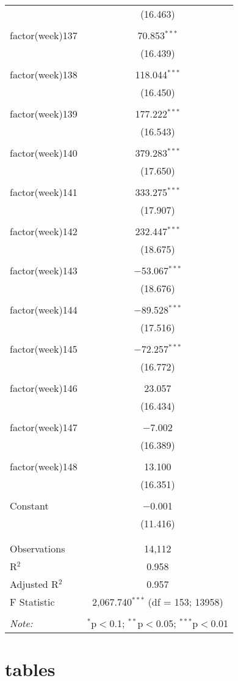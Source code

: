 \documentclass{article}
\begin{document}
\begin{table}[!htbp]
\begin{tabular}{@{\extracolsep{5pt}}lc}
  & (16.463) \\ 
  & \\ 
 factor(week)137 & 70.853$^{***}$ \\ 
  & (16.439) \\ 
  & \\ 
 factor(week)138 & 118.044$^{***}$ \\ 
  & (16.450) \\ 
  & \\ 
 factor(week)139 & 177.222$^{***}$ \\ 
  & (16.543) \\ 
  & \\ 
 factor(week)140 & 379.283$^{***}$ \\ 
  & (17.650) \\ 
  & \\ 
 factor(week)141 & 333.275$^{***}$ \\ 
  & (17.907) \\ 
  & \\ 
 factor(week)142 & 232.447$^{***}$ \\ 
  & (18.675) \\ 
  & \\ 
 factor(week)143 & $-$53.067$^{***}$ \\ 
  & (18.676) \\ 
  & \\ 
 factor(week)144 & $-$89.528$^{***}$ \\ 
  & (17.516) \\ 
  & \\ 
 factor(week)145 & $-$72.257$^{***}$ \\ 
  & (16.772) \\ 
  & \\ 
 factor(week)146 & 23.057 \\ 
  & (16.434) \\ 
  & \\ 
 factor(week)147 & $-$7.002 \\ 
  & (16.389) \\ 
  & \\ 
 factor(week)148 & 13.100 \\ 
  & (16.351) \\ 
  & \\ 
 Constant & $-$0.001 \\ 
  & (11.416) \\ 
  & \\ 
\hline \\[-1.8ex] 
Observations & 14,112 \\ 
R$^{2}$ & 0.958 \\ 
Adjusted R$^{2}$ & 0.957 \\ 
F Statistic & 2,067.740$^{***}$ (df = 153; 13958) \\ 
\hline 
\hline \\[-1.8ex] 
\textit{Note:}  & \multicolumn{1}{r}{$^{*}$p$<$0.1; $^{**}$p$<$0.05; $^{***}$p$<$0.01} \\ 
\end{tabular} 
\end{table} 


\section{tables}
\end{document}
